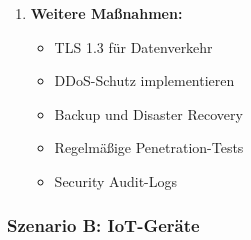 \documentclass[12pt,a4paper]{article}
\begin{document}
\begin{tcolorbox}[colback=solutionbg, colframe=black!30]
\begin{enumerate}[1.]
    \item \textbf{Weitere Maßnahmen:}
    \begin{itemize}
        \item TLS 1.3 für Datenverkehr
        \item DDoS-Schutz implementieren
        \item Backup und Disaster Recovery
        \item Regelmäßige Penetration-Tests
        \item Security Audit-Logs
    \end{itemize}
\end{enumerate}

\end{tcolorbox}

\subsubsection*{Szenario B: IoT-Geräte}
\end{document}
